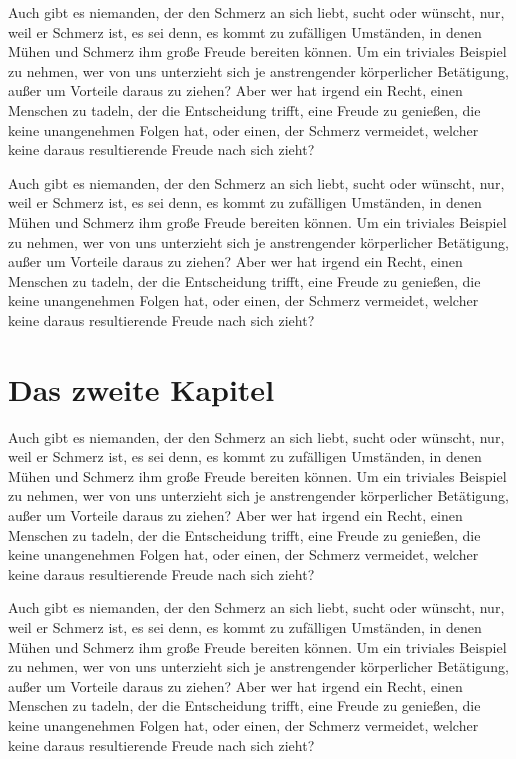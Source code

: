 Auch gibt es niemanden, der den Schmerz an sich liebt, sucht oder wünscht, nur, weil er Schmerz ist, es sei denn, es kommt zu zufälligen Umständen, in denen Mühen und Schmerz ihm große Freude bereiten können. Um ein triviales Beispiel zu nehmen, wer von uns unterzieht sich je anstrengender körperlicher Betätigung, außer um Vorteile daraus zu ziehen? Aber wer hat irgend ein Recht, einen Menschen zu tadeln, der die Entscheidung trifft, eine Freude zu genießen, die keine unangenehmen Folgen hat, oder einen, der Schmerz vermeidet, welcher keine daraus resultierende Freude nach sich zieht?

Auch gibt es niemanden, der den Schmerz an sich liebt, sucht oder wünscht, nur, weil er Schmerz ist, es sei denn, es kommt zu zufälligen Umständen, in denen Mühen und Schmerz ihm große Freude bereiten können. Um ein triviales Beispiel zu nehmen, wer von uns unterzieht sich je anstrengender körperlicher Betätigung, außer um Vorteile daraus zu ziehen? Aber wer hat irgend ein Recht, einen Menschen zu tadeln, der die Entscheidung trifft, eine Freude zu genießen, die keine unangenehmen Folgen hat, oder einen, der Schmerz vermeidet, welcher keine daraus resultierende Freude nach sich zieht?

\section{Das zweite Kapitel}
Auch gibt es niemanden, der den Schmerz an sich liebt, sucht oder wünscht, nur, weil er Schmerz ist, es sei denn, es kommt zu zufälligen Umständen, in denen Mühen und Schmerz ihm große Freude bereiten können. Um ein triviales Beispiel zu nehmen, wer von uns unterzieht sich je anstrengender körperlicher Betätigung, außer um Vorteile daraus zu ziehen? Aber wer hat irgend ein Recht, einen Menschen zu tadeln, der die Entscheidung trifft, eine Freude zu genießen, die keine unangenehmen Folgen hat, oder einen, der Schmerz vermeidet, welcher keine daraus resultierende Freude nach sich zieht?

Auch gibt es niemanden, der den Schmerz an sich liebt, sucht oder wünscht, nur, weil er Schmerz ist, es sei denn, es kommt zu zufälligen Umständen, in denen Mühen und Schmerz ihm große Freude bereiten können. Um ein triviales Beispiel zu nehmen, wer von uns unterzieht sich je anstrengender körperlicher Betätigung, außer um Vorteile daraus zu ziehen? Aber wer hat irgend ein Recht, einen Menschen zu tadeln, der die Entscheidung trifft, eine Freude zu genießen, die keine unangenehmen Folgen hat, oder einen, der Schmerz vermeidet, welcher keine daraus resultierende Freude nach sich zieht?


